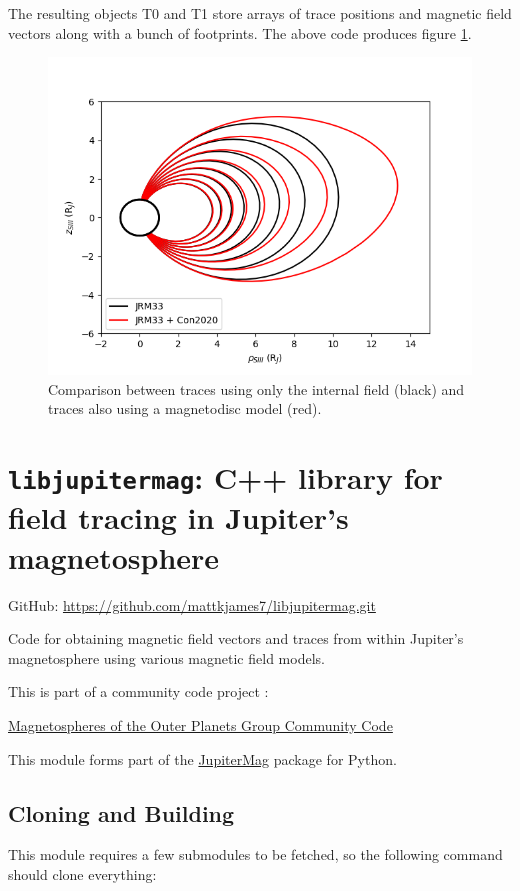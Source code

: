 		The resulting objects T0 and T1 store arrays of trace positions and magnetic field vectors along with a bunch of footprints. The above code produces figure \ref{FigJMCT}.
		
		\begin{figure}[h]
			\centering
			\includegraphics[width=0.7\linewidth]{figures/ch3_JMCompareTrace.png}
			\caption{Comparison between traces using only the internal field (black) and traces also using a magnetodisc model (red). \label{FigJMCT}}
		\end{figure}
	

	\section{\texttt{libjupitermag}: C++ library for field tracing in Jupiter's magnetosphere}

		GitHub: \href{https://github.com/mattkjames7/libjupitermag.git}{https://github.com/mattkjames7/libjupitermag.git}

		Code for obtaining magnetic field vectors and traces from within Jupiter's magnetosphere using various magnetic field models.

		This is part of a community code project :
		
		\href{https://lasp.colorado.edu/home/mop/missions/juno/community-code/}{Magnetospheres of the Outer Planets Group Community Code}
		
		This module forms part of the \href{https://github.com/mattkjames7/JupiterMag.git}{JupiterMag} package for Python.
		
	\subsection{Cloning and Building}
	
		This module requires a few submodules to be fetched, so the following command should clone everything:
	
